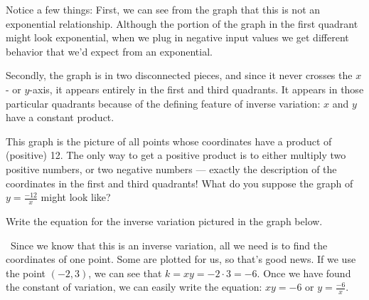 Notice a few things: First, we can see from the graph that this is not an exponential relationship. Although the portion of the graph in the first quadrant might look exponential, when we plug in negative input values we get different behavior that we'd expect from an exponential.

Secondly, the graph is in two disconnected pieces, and since it never crosses the $x$- or $y$-axis, it appears entirely in the first and third quadrants. It appears in those particular quadrants because of the defining feature of inverse variation: $x$ and $y$ have a constant product.

This graph is the picture of all points whose coordinates have a product of (positive) 12. The only way to get a positive product is to either multiply two positive numbers, or two negative numbers --- exactly the description of the coordinates in the first and third quadrants! What do you suppose the graph of $y=\frac{-12}{x}$ might look like?

\begin{boxedex}
Write the equation for the inverse variation pictured in the graph below.

\begin{center}
\end{center}


\exsoln\ Since we know that this is an inverse variation, all we need is to find the coordinates of one point. Some are plotted for us, so that's good news. If we use the point $(-2, 3)$, we can see that $k = xy = -2\cdot3 = -6$. Once we have found the constant of variation, we can easily write the equation: $xy=-6$ or $y=\frac{-6}{x}$.
\end{boxedex}

